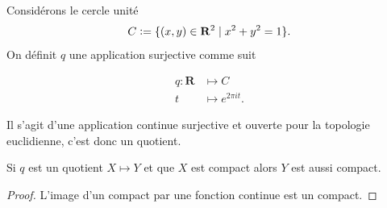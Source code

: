 \documentclass[main.tex]{subfiles}
\begin{document}
	\begin{example}
		Considérons le cercle unité \[
			C \vcentcolon= \{(x,y) \in \mathbf{R}^2 \;|\; x^2 + y^2 = 1\} 
		.\] 
		On définit $q$ une application surjective comme suit \\ 
		\begin{minipage}{0.5\textwidth}
			\begin{align*}
				q : \mathbf{R} &\longmapsto C\\
				t&\longmapsto e^{2\pi it}
			.\end{align*}	
		\end{minipage}
		\hfill
		\begin{minipage}{0.5\textwidth}
			\centering
		\end{minipage}
		\bigskip

		Il s'agit d'une application continue surjective et ouverte pour la topologie euclidienne, c'est donc un quotient.
	\end{example}
	
	\begin{prop}
		Si $q$ est un quotient $X \longmapsto Y$ et que $X$ est compact alors $Y$ est aussi compact.
	\end{prop}
	\begin{proof}
		L'image d'un compact par une fonction continue est un compact.
	\end{proof}
\end{document}
